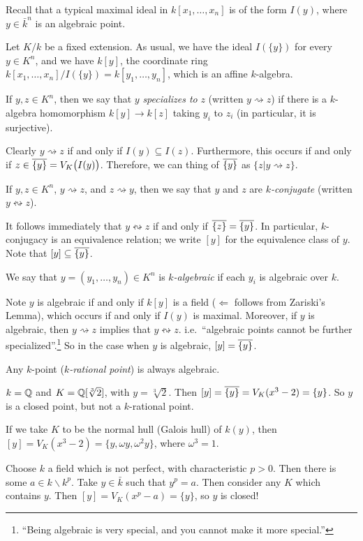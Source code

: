  \setcounter{lecture}{22}

 Recall that a typical maximal ideal in $k[x_1,\dots, x_n]$ is of the form $I(y)$, where
 $y\in \bar k^n$ is an algebraic point.

 Let $K/k$ be a fixed extension. As usual, we have the ideal $I(\{y\})$ for every $y\in
 K^n$, and we have $k[y]$, the coordinate ring $k[x_1,\dots, x_n]/I(\{y\}) = k[y_1,\dots,
 y_n]$, which is an affine $k$-algebra.
 \begin{definition}
   If $y,z\in K^n$, then we say that $y$ \emph{specializes to} $z$ (written
   $y\rightsquigarrow z$) if there is a $k$-algebra homomorphism $k[y]\to k[z]$ taking
   $y_i$ to $z_i$ (in particular, it is surjective).
 \end{definition}
 Clearly $y\rightsquigarrow z$ if and only if $I(y)\subseteq I(z)$. Furthermore, this
 occurs if and only if $z\in \overline{\{y\}}=V_K\bigl(I(y)\bigr)$. Therefore, we can thing
 of $\overline{\{y\}}$ as $\{z|y\rightsquigarrow z\}$.
 \begin{definition}
   If $y,z\in K^n$, $y\rightsquigarrow z$, and $z\rightsquigarrow y$, then we say that
   $y$ and $z$ are \emph{$k$-conjugate} (written $ y\leftrightsquigarrow z$).
 \end{definition}
 It follows immediately that $y\leftrightsquigarrow z$ if and only if $\overline{\{z\}} =
 \overline{\{y\}}$. In particular, $k$-conjugacy is an equivalence relation; we write $[y]$
 for the equivalence class of $y$. Note that $[y]\subseteq \overline{\{y\}}$.
 \begin{definition}
   We say that $y=(y_1,\dots, y_n)\in K^n$ is \emph{$k$-algebraic} if each $y_i$ is
   algebraic over $k$.
 \end{definition}
 Note $y$ is algebraic if and only if $k[y]$ is a field ($\Leftarrow$ follows from
 Zariski's Lemma), which occurs if and only if $I(y)$ is maximal. Moreover, if $y$ is
 algebraic, then $y \rightsquigarrow z$ implies that $y\leftrightsquigarrow z$. i.e.\
 ``algebraic points cannot be further specialized''.\footnote{``Being algebraic is very
 special, and you cannot make it more special.''} So in the case when $y$ is algebraic,
 $[y]=\overline{\{y\}}$.
 \begin{remark}
   Any $k$-point (\emph{$k$-rational point}) is always algebraic.
 \end{remark}
 \begin{example}
   $k=\mathbb{Q}$ and $K=\mathbb{Q}[\sqrt[3]{2}]$, with $y=\sqrt[3]{2}$. Then $[y]=\overline{\{y\}}=V_K(x^3-2)=\{y\}$. So $y$ is a closed point, but not a $k$-rational point.

   If we take $K$ to be the normal hull (Galois hull) of $k(y)$, then $[y]=V_K(x^3-2) =
   \{y,\omega y,\omega^2 y\}$, where $\omega^3=1$.
 \end{example}
 \begin{example}
   Choose $k$ a field which is not perfect, with characteristic $p>0$. Then there is some
   $a\in k\smallsetminus k^p$. Take $y\in \bar k$ such that $y^p=a$. Then consider any
   $K$ which contains $y$. Then $[y]=V_K(x^p-a)=\{y\}$, so $y$ is closed!
 \end{example}

